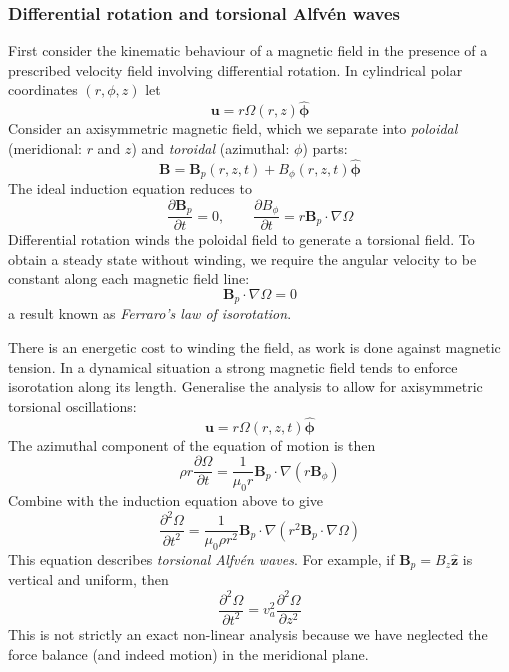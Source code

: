 \documentclass{jknotes}
\newcommand{\B}{\symbf{B}}
\renewcommand{\u}{\symbf{u}}
\begin{document}
\subsubsection{Differential rotation and torsional Alfv\'{e}n waves}
First consider the kinematic behaviour of a magnetic field in the presence of
a prescribed velocity field involving differential rotation. In cylindrical
polar coordinates $(r,\phi,z)$ let 
\begin{equation}
	\u = r \Omega(r,z) \hat{\symbf{\phi}}
\end{equation}
Consider an axisymmetric magnetic field, which we separate into
\emph{poloidal} (meridional: $r$ and $z$) and \emph{toroidal} (azimuthal:
$\phi$) parts:
\begin{equation}
	\B = \B_p(r,z,t) + B_\phi(r,z,t) \hat{\symbf{\phi}}
\end{equation}
The ideal induction equation reduces to
\begin{equation}
	\frac{\partial \B_p}{\partial t} = 0, \hspace{2em} \frac{\partial
	B_\phi}{\partial t} = r \B_p \cdot \nabla \Omega
\end{equation}
Differential rotation winds the poloidal field to generate a torsional field.
To obtain a steady state without winding, we require the angular velocity to
be constant along each magnetic field line:
\begin{equation}
	\B_p \cdot \nabla \Omega = 0
\end{equation}
a result known as \emph{Ferraro's law of isorotation}. 

There is an energetic cost to winding the field, as work is done against
magnetic tension. In a dynamical situation a strong magnetic field tends to
enforce isorotation along its length. Generalise the analysis to allow for
axisymmetric torsional oscillations:
\begin{equation}
	\u = r \Omega(r,z,t) \hat{\symbf{\phi}}
\end{equation}
The azimuthal component of the equation of motion is then
\begin{equation}
	\rho r \frac{\partial \Omega}{\partial t} = \frac{1}{\mu_0 r} \B_p \cdot
	\nabla( r \B_\phi)
\end{equation}
Combine with the induction equation above to give
\begin{equation}
	\frac{\partial^2 \Omega}{\partial t^2} = \frac{1}{\mu_0 \rho r^2} \B_p
	\cdot \nabla (r^2 \B_p \cdot \nabla \Omega)
\end{equation}
This equation describes \emph{torsional Alfv\'{e}n waves}. For example, if
$\B_p = B_z \hat{\symbf{z}}$ is vertical and uniform, then
\begin{equation}
	\frac{\partial^2 \Omega}{\partial t^2} = v_a^2 \frac{\partial^2
	\Omega}{\partial z^2}
\end{equation}
This is not strictly an exact non-linear analysis because we have neglected
the force balance (and indeed motion) in the meridional plane.
\end{document}
